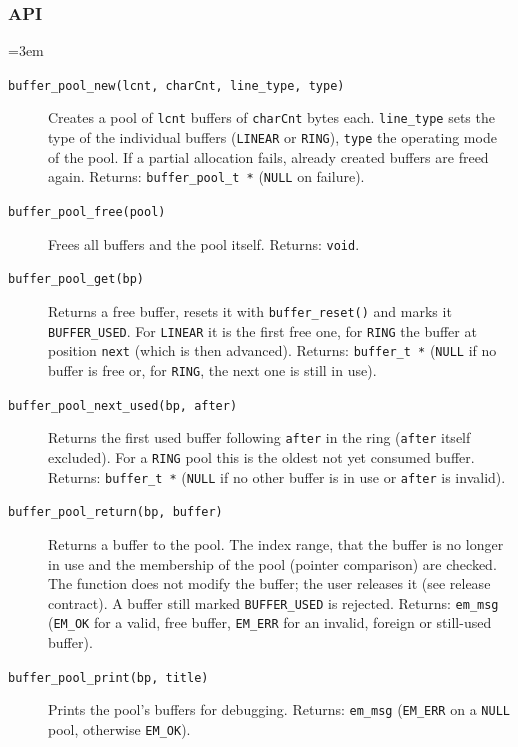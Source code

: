 \subsubsection*{API}
{\sloppy\emergencystretch=3em
\begin{description}
\item[\texttt{buffer\_pool\_new(lcnt, charCnt, line\_type, type)}] Creates a
  pool of \verb|lcnt| buffers of \verb|charCnt| bytes each. \verb|line_type|
  sets the type of the individual buffers (\verb|LINEAR| or \verb|RING|),
  \verb|type| the operating mode of the pool. If a partial allocation fails,
  already created buffers are freed again. Returns: \verb|buffer_pool_t *|
  (\verb|NULL| on failure).
\item[\texttt{buffer\_pool\_free(pool)}] Frees all buffers and the pool itself.
  Returns: \verb|void|.
\item[\texttt{buffer\_pool\_get(bp)}] Returns a free buffer, resets it with
  \verb|buffer_reset()| and marks it \verb|BUFFER_USED|. For \verb|LINEAR|
  it is the first free one, for \verb|RING| the buffer at position
  \verb|next| (which is then advanced). Returns: \verb|buffer_t *|
  (\verb|NULL| if no buffer is free or, for \verb|RING|, the next one is
  still in use).
\item[\texttt{buffer\_pool\_next\_used(bp, after)}] Returns the first used
  buffer following \verb|after| in the ring (\verb|after| itself excluded).
  For a \verb|RING| pool this is the oldest not yet consumed buffer. Returns:
  \verb|buffer_t *| (\verb|NULL| if no other buffer is in use or
  \verb|after| is invalid).
\item[\texttt{buffer\_pool\_return(bp, buffer)}] Returns a buffer to the pool.
  The index range, that the buffer is no longer in use and the membership of
  the pool (pointer comparison) are checked. The function does not modify the
  buffer; the user releases it (see release contract). A buffer still marked
  \verb|BUFFER_USED| is rejected. Returns: \verb|em_msg| (\verb|EM_OK| for a
  valid, free buffer, \verb|EM_ERR| for an invalid, foreign or still-used
  buffer).
\item[\texttt{buffer\_pool\_print(bp, title)}] Prints the pool's buffers for
  debugging. Returns: \verb|em_msg| (\verb|EM_ERR| on a \verb|NULL| pool,
  otherwise \verb|EM_OK|).
\end{description}
\par}
